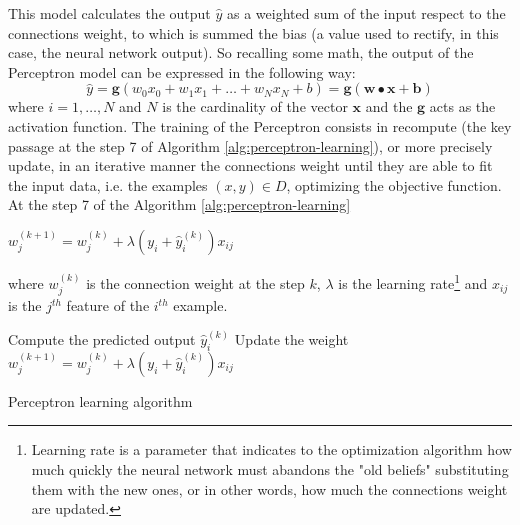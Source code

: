 This model calculates the output $\hat{y}$ as a weighted sum of the input respect to the connections weight, to which is summed the bias (a value used to rectify, in this case, the neural network output). So recalling some math, the output of the Perceptron model can be expressed in the following way:
\begin{equation}
	\hat{y} = \textbf{g}(w_{0}x_{0} + w_{1}x_{1} + \dots + w_{N}x_{N} + b  ) = \textbf{g}(\textbf{w} \bullet \textbf{x} + \textbf{b})
\end{equation}
where $i = 1, \dots, N$ and $N$ is the cardinality of the vector $\textbf{x}$ and the $\textbf{g}$ acts as the activation function.
The training of the Perceptron consists in recompute (the key passage at the step 7 of Algorithm \ref{alg:perceptron-learning}), or more precisely update, in an iterative manner the connections weight until they are able to fit the input data, i.e. the examples $(x, y) \in D$, optimizing the objective function.
At the step 7 of the Algorithm \ref{alg:perceptron-learning}
\begin{center}
	$w_{j}^{(k + 1)} = w_{j}^{(k)} + \lambda(y_{i} + \hat{y}_{i}^{(k)})x_{ij}$	
\end{center}
where $w_{j}^{(k)}$ is the connection weight at the step $k$, $\lambda$ is the learning rate\footnote{Learning rate is a parameter that indicates to the optimization algorithm how much quickly the neural network must abandons the "old beliefs" substituting them with the new ones, or in other words, how much the connections weight are updated.} and $x_{ij}$ is the $j^{th}$ feature of the $i^{th}$ example.

\begin{algorithm}
	\begin{algorithmic}[1]
		\Repeat
				\State Compute the predicted output $\hat{y}_{i}^{(k)}$
					\State Update the weight $w_{j}^{(k + 1)} = w_{j}^{(k)} + \lambda(y_{i} + \hat{y}_{i}^{(k)})x_{ij}$
				\EndFor
			\EndFor
	\end{algorithmic}
	\caption{Perceptron learning algorithm \cite{ITDM:2014}}\label{alg:perceptron-learning}
\end{algorithm}

